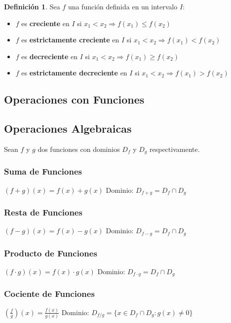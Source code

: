 \documentclass[12pt, a4paper, oneside]{book}
\theoremstyle{definition}
\newtheorem{definicion}{Definición}[chapter]
\begin{document}
\begin{definicion}
Sea $f$ una función definida en un intervalo $I$:
\begin{itemize}
    \item $f$ es \textbf{creciente} en $I$ si $x_1 < x_2 \Rightarrow f(x_1) \leq f(x_2)$
    \item $f$ es \textbf{estrictamente creciente} en $I$ si $x_1 < x_2 \Rightarrow f(x_1) < f(x_2)$
    \item $f$ es \textbf{decreciente} en $I$ si $x_1 < x_2 \Rightarrow f(x_1) \geq f(x_2)$
    \item $f$ es \textbf{estrictamente decreciente} en $I$ si $x_1 < x_2 \Rightarrow f(x_1) > f(x_2)$
\end{itemize}
\end{definicion}

\subsection{Operaciones con Funciones}

\subsection{Operaciones Algebraicas}

Sean $f$ y $g$ dos funciones con dominios $D_f$ y $D_g$ respectivamente.

\subsubsection{Suma de Funciones}
$(f + g)(x) = f(x) + g(x)$
Dominio: $D_{f+g} = D_f \cap D_g$

\subsubsection{Resta de Funciones}
$(f - g)(x) = f(x) - g(x)$
Dominio: $D_{f-g} = D_f \cap D_g$

\subsubsection{Producto de Funciones}
$(f \cdot g)(x) = f(x) \cdot g(x)$
Dominio: $D_{f \cdot g} = D_f \cap D_g$

\subsubsection{Cociente de Funciones}
$\left(\frac{f}{g}\right)(x) = \frac{f(x)}{g(x)}$
Dominio: $D_{f/g} = \{x \in D_f \cap D_g : g(x) \neq 0\}$
\end{document}
